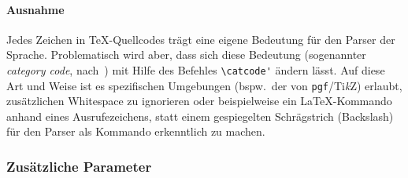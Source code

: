 \paragraph*{Ausnahme}\par
Jedes Zeichen in \TeX{}-Quellcodes trägt eine eigene Bedeutung für den Parser der Sprache. Problematisch wird aber, dass sich diese Bedeutung (sogenannter \textit{category code}, nach~\cite[Appendix D, Seite 371]{texbook}) mit Hilfe des Befehles \verb/\catcode'/ ändern lässt. Auf diese Art und Weise ist es spezifischen Umgebungen (bspw.\ der von \texttt{pgf}/Ti\textit{k}Z) erlaubt, zusätzlichen Whitespace zu ignorieren oder beispielweise ein \LaTeX{}-Kommando anhand eines Ausrufezeichens, statt einem gespiegelten Schrägstrich (Backslash) für den Parser als Kommando erkenntlich zu machen.%
\begin{comment}
{\catcode'\=9\relax \catcode'!=0 0LaTeX} wurde mit einem Ausrufezeichen produziert. \LaTeX{} hingegen nicht. Category Codes erlauben beispielsweise auch die Nutzung eines Hashtags innerhalb eines {\catcode'#=11 #Satzes}.
\end{comment}








\subsubsection{Zusätzliche Parameter}
